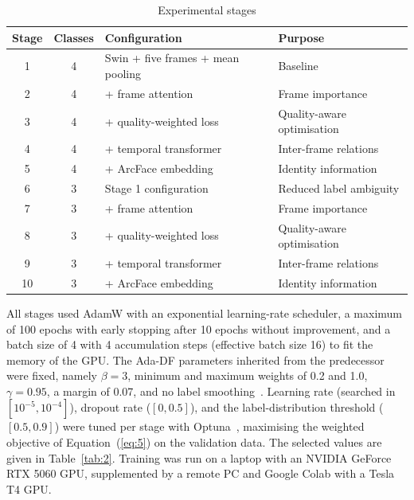 \documentclass[10pt,a4paper,twocolumn]{article}
\begin{document}
\begin{table}[t]
  \caption{Experimental stages}
  \label{tab:1}
  \centering
  \footnotesize
  \setlength{\tabcolsep}{3pt}
  \begin{tabular}{ccp{29mm}p{22mm}}
    \toprule
    Stage & Classes & Configuration & Purpose \\
    \midrule
    1 & 4 & Swin + five frames + mean pooling & Baseline \\
    2 & 4 & + frame attention & Frame importance \\
    3 & 4 & + quality-weighted loss & Quality-aware optimisation \\
    4 & 4 & + temporal transformer & Inter-frame relations \\
    5 & 4 & + ArcFace embedding & Identity information \\
    6 & 3 & Stage 1 configuration & Reduced label ambiguity \\
    7 & 3 & + frame attention & Frame importance \\
    8 & 3 & + quality-weighted loss & Quality-aware optimisation \\
    9 & 3 & + temporal transformer & Inter-frame relations \\
    10 & 3 & + ArcFace embedding & Identity information \\
    \bottomrule
  \end{tabular}
\end{table}

All stages used AdamW with an exponential learning-rate scheduler, a maximum of 100 epochs with early stopping after 10 epochs without improvement, and a batch size of 4 with 4 accumulation steps (effective batch size 16) to fit the memory of the GPU. The Ada-DF parameters inherited from the predecessor were fixed, namely $\beta=3$, minimum and maximum weights of 0.2 and 1.0, $\gamma=0.95$, a margin of 0.07, and no label smoothing~\cite{wardana}. Learning rate (searched in $[10^{-5}, 10^{-4}]$), dropout rate ($[0, 0.5]$), and the label-distribution threshold ($[0.5, 0.9]$) were tuned per stage with Optuna~\cite{akiba}, maximising the weighted objective of Equation~(\ref{eq:5}) on the validation data. The selected values are given in Table~\ref{tab:2}. Training was run on a laptop with an NVIDIA GeForce RTX 5060 GPU, supplemented by a remote PC and Google Colab with a Tesla T4 GPU.
\end{document}
